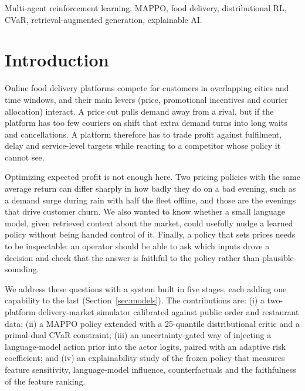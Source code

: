 \documentclass[conference]{IEEEtran}
\begin{document}
\begin{IEEEkeywords}
Multi-agent reinforcement learning, MAPPO, food delivery, distributional RL, CVaR, retrieval-augmented generation, explainable AI.
\end{IEEEkeywords}

\section{Introduction}
Online food delivery platforms compete for customers in overlapping cities and time windows, and their main levers (price, promotional incentives and courier allocation) interact. A price cut pulls demand away from a rival, but if the platform has too few couriers on shift that extra demand turns into long waits and cancellations. A platform therefore has to trade profit against fulfilment, delay and service-level targets while reacting to a competitor whose policy it cannot see.

Optimizing expected profit is not enough here. Two pricing policies with the same average return can differ sharply in how badly they do on a bad evening, such as a demand surge during rain with half the fleet offline, and those are the evenings that drive customer churn. We also wanted to know whether a small language model, given retrieved context about the market, could usefully nudge a learned policy without being handed control of it. Finally, a policy that sets prices needs to be inspectable: an operator should be able to ask which inputs drove a decision and check that the answer is faithful to the policy rather than plausible-sounding.

We address these questions with a system built in five stages, each adding one capability to the last (Section~\ref{sec:models}). The contributions are: (i) a two-platform delivery-market simulator calibrated against public order and restaurant data; (ii) a MAPPO policy extended with a 25-quantile distributional critic and a primal-dual CVaR constraint; (iii) an uncertainty-gated way of injecting a language-model action prior into the actor logits, paired with an adaptive risk coefficient; and (iv) an explainability study of the frozen policy that measures feature sensitivity, language-model influence, counterfactuals and the faithfulness of the feature ranking.

\end{document}

